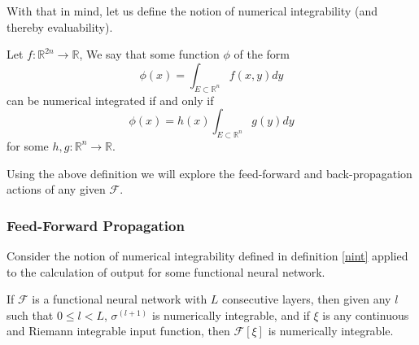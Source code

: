 With that in mind, let us define the notion of numerical integrability (and thereby evaluability).
\begin{definition} \label{nint}
Let $f: \mathbb{R}^{2n}\to\mathbb{R}$, 
We say that some function $\phi$ of the form \begin{equation}\phi(x) = \int_{E\subset\mathbb{R}^n}{f(x,y)dy}\end{equation} can be numerical integrated if and only if
\begin{equation}\phi(x) = h(x)\int_{E\subset\mathbb{R}^n}{g(y)dy}\end{equation} for some $h,g: \mathbb{R}^{n}\to\mathbb{R}$.
\end{definition}

Using the above definition we will explore the feed-forward and back-propagation actions of any given $\mathcal{F}$.












\subsubsection{Feed-Forward Propagation}

Consider the notion of numerical integrability defined in definition \ref{nint} applied to the calculation of output for some functional neural network.

\begin{theorem}
If $\mathcal{F}$ is a functional neural network with $L$ consecutive layers, then given any $l$ such that $0\leq l <  L$, $\sigma^{(l+1)}$ is numerically integrable, and if $\xi$ is any continuous and Riemann integrable input function, then $\mathcal{F}[\xi]$ is numerically integrable.
\end{theorem}

